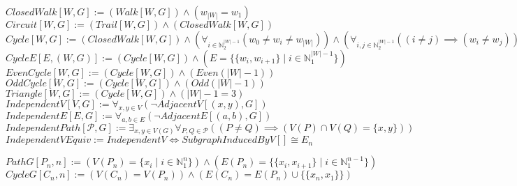 \documentclass{book}
\newcommand{\abr}{:=}
\newcommand{\pr}[1]{\left(#1\right)}
\newcommand{\st}{\mathbin{|}}
\newcommand{\utup}[1]{\{#1\}}
\begin{document}
$ClosedWalk[W, G] \abr (Walk[W, G]) \land (w_{|W|} = w_1)$ \\
$Circuit[W, G] \abr (Trail[W, G]) \land (ClosedWalk[W, G])$ \\
$Cycle[W, G] \abr (ClosedWalk[W, G]) \land \pr{\forall_{i \in \mathbb{N}_2^{|W| - 1}}(w_0 \neq w_i \neq w_{|W|})} \land \pr{\forall_{i, j \in \mathbb{N}_2^{|W| - 1}}\pr{(i \neq j) \implies (w_i \neq w_j)}} \land (|W| - 1 \geq 3)$ \\
$CycleE[E, (W, G)] \abr (Cycle[W, G]) \land (E = \{\utup{w_i, w_{i + 1}} \st i \in \mathbb{N}_1^{|W| - 1}\})$ \\
$EvenCycle[W, G] \abr (Cycle[W, G]) \land \pr{Even(|W| - 1)}$ \\
$OddCycle[W, G] \abr (Cycle[W, G]) \land \pr{Odd(|W| - 1)}$ \\
$Triangle[W, G] \abr (Cycle[W, G]) \land (|W| - 1 = 3)$ \\

$IndependentV[V, G] \abr \forall_{x, y \in V}\pr{\lnot AdjacentV[(x, y), G]}$ \\
$IndependentE[E, G] \abr \forall_{a, b \in E}\pr{\lnot AdjacentE[(a, b), G]}$ \\
$IndependentPath[\mathcal{P}, G] \abr \exists_{x, y \in V(G)} \forall_{P, Q \in \mathcal{P}}\pr{(P \neq Q) \implies \pr{V(P) \cap V(Q) = \utup{x, y}}}$ \\
$IndependentVEquiv \abr IndependentV \iff SubgraphInducedByV[] \cong E_n$

$PathG[P_n, n] \abr \pr{V(P_n) = \{x_i \st i \in \mathbb{N}_1^{n}\}} \land \pr{E(P_n) = \{\utup{x_i, x_{i + 1}} \st i \in \mathbb{N}_1^{n - 1}\}}$ \\
$CycleG[C_n, n] \abr \pr{V(C_n) = V(P_ n)} \land \pr{E(C_n) = E(P_n) \cup \{\utup{x_n, x_1}\}}$ \\
\end{document}
